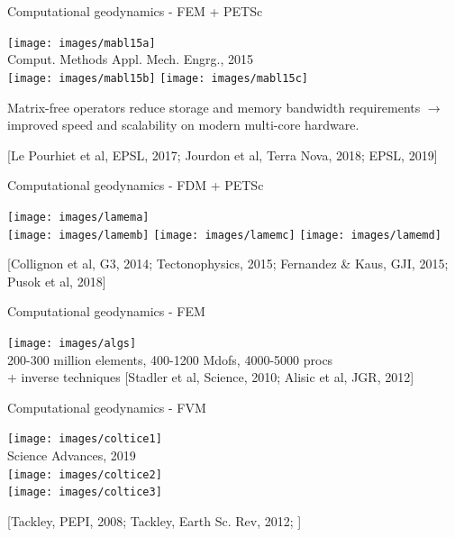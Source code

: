 \documentclass[handout]{beamer}
\begin{document}
\begin{frame}[plain]{Computational geodynamics - FEM + PETSc}
\begin{center}
\texttt{[image: images/mabl15a]}\\
\vspace{-2mm}
{\tiny Comput. Methods Appl. Mech. Engrg., 2015}\\
\texttt{[image: images/mabl15b]}
\texttt{[image: images/mabl15c]}
\end{center}

\vspace{-2mm}
Matrix-free operators reduce storage and memory bandwidth requirements
$\rightarrow$ improved speed and scalability on modern multi-core hardware. 

{\tiny [Le Pourhiet et al, EPSL, 2017; Jourdon et al, Terra Nova, 2018; EPSL, 2019]}
\end{frame}


\begin{frame}[plain]{Computational geodynamics - FDM + PETSc}

\begin{center}
\texttt{[image: images/lamema]}\\
\vspace{3mm}
\texttt{[image: images/lamemb]}
\texttt{[image: images/lamemc]}
\texttt{[image: images/lamemd]}
\end{center}

{\tiny [Collignon et al, G3, 2014; Tectonophysics, 2015; Fernandez \& Kaus, GJI, 2015; Pusok et al, 2018]}

\end{frame}


\begin{frame}[plain]{Computational geodynamics - FEM}

\texttt{[image: images/algs]}\\
200-300 million elements, 400-1200 Mdofs, 4000-5000 procs\\
+ inverse techniques
{\tiny [Stadler et al, Science, 2010; Alisic et al, JGR, 2012]}

\end{frame}

\begin{frame}[plain]{Computational geodynamics - FVM}

\begin{center}
\texttt{[image: images/coltice1]}\\
Science Advances, 2019\\
\texttt{[image: images/coltice2]}\\
\texttt{[image: images/coltice3]}
\end{center}

{\tiny [Tackley, PEPI, 2008; Tackley, Earth Sc. Rev, 2012; ]}


\end{frame}
\end{document}
